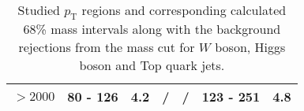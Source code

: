 \begin{table}[]
\begin{tabular}{l||ll||ll||ll}
$> 2000$ & \multicolumn{1}{l|}{80 - 126}                       & 4.2                             & \multicolumn{1}{l|}{/}                 & /                               & \multicolumn{1}{l|}{123 - 251}         & 4.8                             \\ \hline
\end{tabular}
\caption{\footnotesize{Studied $p_{\mathrm{T}}$ regions and corresponding calculated 68\% mass intervals along with the background rejections from the mass cut for $W$ boson, Higgs boson and Top quark jets.}} \label{table:mass_cut}
\end{table} 


